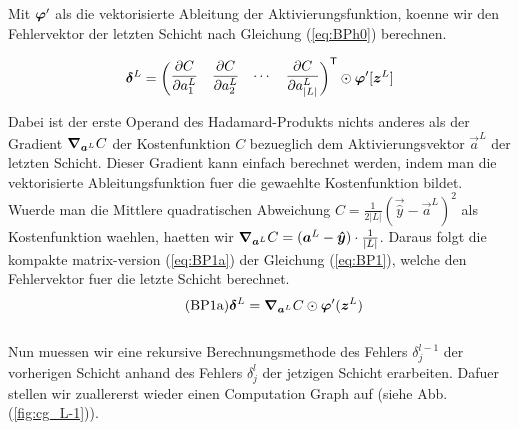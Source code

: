 Mit $\bm{\varphi}'$ als die vektorisierte Ableitung der Aktivierungsfunktion,
koenne wir den Fehlervektor der letzten Schicht nach Gleichung (\ref{eq:BPh0}) berechnen.

\begin{equation}\label{eq:BPh0}
  \bm{\delta}^L = \begin{pmatrix} \displaystyle\frac{\partial C}{\partial a_1^L} & \displaystyle\frac{\partial C}{\partial a_2^L} & \cdots & \displaystyle\frac{\partial C}{\partial a_{|L|}^L}\end{pmatrix}^{\mathsf{T}} \odot \bm{\varphi}'[\bm{z}^L]
\end{equation}

Dabei ist der erste Operand des Hadamard-Produkts nichts anderes als
der Gradient $\bm{\nabla}_{\bm{a}^L} C$ der Kostenfunktion $C$ bezueglich dem Aktivierungsvektor
$\vec{a}^L$ der letzten Schicht. Dieser Gradient kann einfach berechnet werden, indem man die
vektorisierte Ableitungsfunktion fuer die gewaehlte Kostenfunktion bildet. Wuerde man die
Mittlere quadratischen Abweichung $C = \frac{1}{2|L|}(\vec{\hat{y}} - \vec{a}^L)^2$ als Kostenfunktion waehlen, haetten wir
$\bm{\nabla}_{\bm{a}^L} C = (\bm{a}^L - \bm{\hat{y}}) \cdot \frac{1}{|L|}$.
\para{}
Daraus folgt die kompakte matrix-version (\ref{eq:BP1a}) der Gleichung
(\ref{eq:BP1}), welche den Fehlervektor fuer die letzte Schicht berechnet.
\\
\begin{equation}\tag{BP1a}\label{eq:BP1a}
  \bm{\delta}^L = \bm{\nabla}_{\bm{a}^L}C \odot \bm{\varphi}'(\bm{z}^L)
\end{equation}
\\
Nun muessen wir eine rekursive Berechnungsmethode des Fehlers $\delta_j^{l-1}$
der vorherigen Schicht anhand des Fehlers $\delta_j^l$ der jetzigen Schicht
erarbeiten. Dafuer stellen wir zuallererst wieder einen Computation Graph auf
(siehe Abb. (\ref{fig:cg_L-1})).
\para{}
